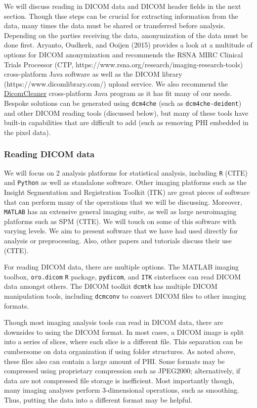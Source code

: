 \documentclass[]{elsarticle} %
\begin{document}
We will discuss reading in DICOM data and DICOM header fields in the
next section. Though thse steps can be crucial for extracting
information from the data, many times the data must be shared or
transferred before analysis. Depending on the parties receiving the
data, anonymization of the data must be done first. Aryanto, Oudkerk,
and Ooijen (2015) provides a look at a multitude of options for DICOM
anonymization and recommends the RSNA MIRC Clinical Trials Processor
(CTP, https://www.rsna.org/research/imaging-research-tools)
cross-platform Java software as well as the DICOM library
(https://www.dicomlibrary.com/) upload service. We also recommend the
\href{https://www.dclunie.com/pixelmed/software/webstart/DicomCleanerUsage.html}{DicomCleaner}
cross-platform Java program as it has fit many of our needs. Bespoke
solutions can be generated using \texttt{dcm4che} (such as
\texttt{dcm4che-deident}) and other DICOM reading tools (discussed
below), but many of these tools have built-in capabilities that are
difficult to add (such as removing PHI embedded in the pixel data).

\hypertarget{reading-dicom-data}{%
\subsubsection{Reading DICOM data}\label{reading-dicom-data}}

We will focus on 2 analysis platforms for statistical analysis,
including \texttt{R} (CITE) and \texttt{Python} as well as standalone
software. Other imaging platforms such as the Insight Segmentation and
Registration Toolkit (ITK) are great pieces of software that can perform
many of the operations that we will be discussing. Moreover,
\texttt{MATLAB} has an extensive general imaging suite, as well as large
neuroimaging platforms such as SPM (CITE). We will touch on some of this
software with varying levels. We aim to present software that we have
had used directly for analysis or preprocessing. Also, other papers and
tutorials discuss their use (CITE).

For reading DICOM data, there are multiple options. The MATLAB imaging
toolbox, \texttt{oro.dicom} \texttt{R} package, \texttt{pydicom}, and
\texttt{ITK} cinterfaces can read DICOM data amongst others. The DICOM
toolkit \texttt{dcmtk} has multiple DICOM manipulation tools, including
\texttt{dcmconv} to convert DICOM files to other imaging formats.

Though most imaging analysis tools can read in DICOM data, there are
downsides to using the DICOM format. In most cases, a DICOM image is
split into a series of slices, where each slice is a different file.
This separation can be cumbersome on data organization if using folder
structures. As noted above, these files also can contain a large amount
of PHI. Some formats may be compressed using proprietary compression
such as JPEG2000; alternatively, if data are not compressed file storage
is inefficient. Most importantly though, many imaging analyses perform
3-dimensional operations, such as smoothing. Thus, putting the data into
a different format may be helpful.
\end{document}
